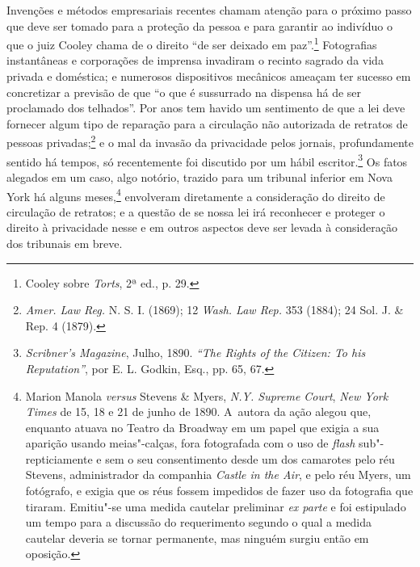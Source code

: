 Invenções e métodos empresariais recentes chamam atenção para o próximo
passo que deve ser tomado para a proteção da pessoa e para garantir ao
indivíduo o que o juiz Cooley chama de o direito ``de ser deixado em
paz''.\footnote{Cooley sobre \emph{Torts}, 2ª ed., p. 29.} Fotografias
instantâneas e corporações de imprensa invadiram o recinto sagrado da
vida privada e doméstica; e numerosos dispositivos mecânicos ameaçam ter
sucesso em concretizar a previsão de que ``o que é sussurrado na
dispensa há de ser proclamado dos telhados''. Por anos tem havido um
sentimento de que a lei deve fornecer algum tipo de reparação para a
circulação não autorizada de retratos de pessoas privadas;\footnote{\emph{Amer.
  Law Reg.} N. S. I. (1869); 12 \emph{Wash. Law Rep.} 353 (1884); 24
  Sol. J. \& Rep. 4 (1879).} e o mal da invasão da privacidade pelos
jornais, profundamente sentido há tempos, só recentemente foi discutido
por um hábil escritor.\footnote{\emph{Scribner's Magazine}, Julho, 1890.
  \emph{``The Rights of the Citizen: To his Reputation''}, por E. L.
  Godkin, Esq., pp. 65, 67.} Os fatos alegados em um caso, algo notório,
trazido para um tribunal inferior em Nova York há alguns
meses,\footnote{Marion Manola \emph{versus} Stevens \& Myers, \emph{N.Y.
  Supreme Court}, \emph{New York Times} de 15, 18 e 21 de junho de 1890.
  A~autora da ação alegou que, enquanto atuava no Teatro da Broadway em
  um papel que exigia a sua aparição usando meias"-calças, fora
  fotografada com o uso de \emph{flash} sub"-repticiamente e sem o seu
  consentimento desde um dos camarotes pelo réu Stevens, administrador
  da companhia \emph{Castle in the Air}, e pelo réu Myers, um fotógrafo,
  e exigia que os réus fossem impedidos de fazer uso da fotografia que
  tiraram. Emitiu"-se uma medida cautelar preliminar \emph{ex parte} e
  foi estipulado um tempo para a discussão do requerimento segundo o
  qual a medida cautelar deveria se tornar permanente, mas ninguém
  surgiu então em oposição.} envolveram diretamente a consideração do
direito de circulação de retratos; e a questão de se nossa lei irá
reconhecer e proteger o direito à privacidade nesse e em outros aspectos
deve ser levada à consideração dos tribunais em breve.


